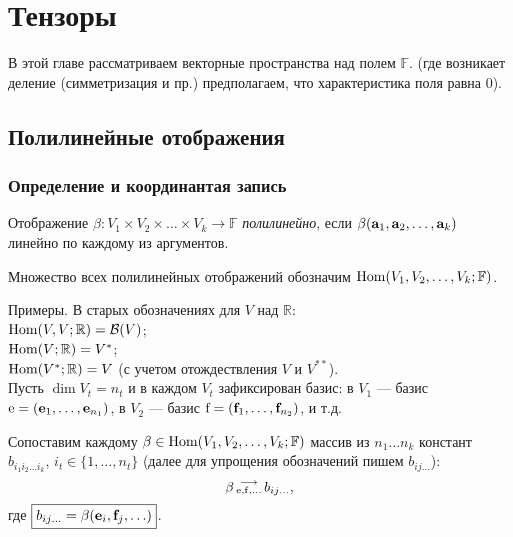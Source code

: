 \chapter{Тензоры
}%

В этой главе рассматриваем векторные пространства над полем $\mathbb{F}$.
(где возникает деление (симметризация и пр.) предполагаем, что характеристика поля равна 0).




\section{Полилинейные отображения}

\subsection{Определение и координантая запись}


Отображение $\beta : V_1\times V_2 \times \ldots \times V_k \to \mathbb{F}$
{\it полилинейно}, если $\beta (\mathbf{a}_1, \mathbf{a}_2, \ldots, \mathbf{a}_k)$ линейно по каждому из аргументов.

\otstup

Множество всех полилинейных отображений обозначим $\mathop{\rm Hom}\nolimits(V_1, V_2, \ldots , V_k; \mathbb{F})$.

\otstup

Примеры. В старых обозначениях для $V$ над $\mathbb{R}$:\\
 $\mathop{\rm Hom}\nolimits(V, V; \mathbb{R}) = \mathcal{B}(V)$;\\
$\mathop{\rm Hom}\nolimits(V; \mathbb{R}) = V^*$;\\
$\mathop{\rm Hom}\nolimits(V^*; \mathbb{R}) = V$ (с учетом отождествления $V$ и $V^{**}$).\\


Пусть $\dim V_t  = n_t$ и в каждом $V_t$ зафиксирован базис:
в $V_1$ --- базис $\mathrm{e} = (\mathbf{e}_1, \ldots, \mathbf{e}_{n_1})$,
в $V_2$ --- базис $\mathrm{f} = (\mathbf{f}_1, \ldots, \mathbf{f}_{n_2})$, и т.д.

Сопоставим каждому $\beta \in \mathop{\rm Hom}\nolimits(V_1, V_2, \ldots , V_k; \mathbb{F})$ массив 
из $n_1\ldots n_k$ констант $b_{i_1 i_2 \ldots i_k}$, $i_t\in \{1, \ldots, n_t\}$
(далее для упрощения обозначений пишем $b_{ij\ldots }$):
\begin{equation}\label{b_{ij..}}
\beta \rsootv{\bazis{e}, \bazis{f}, \ldots } b_{ij \ldots },  
\end{equation}
где $\boxed{b_{i j \ldots } = \beta (\mathbf{e}_{i}, \mathbf{f}_{j}, \ldots )}$.

